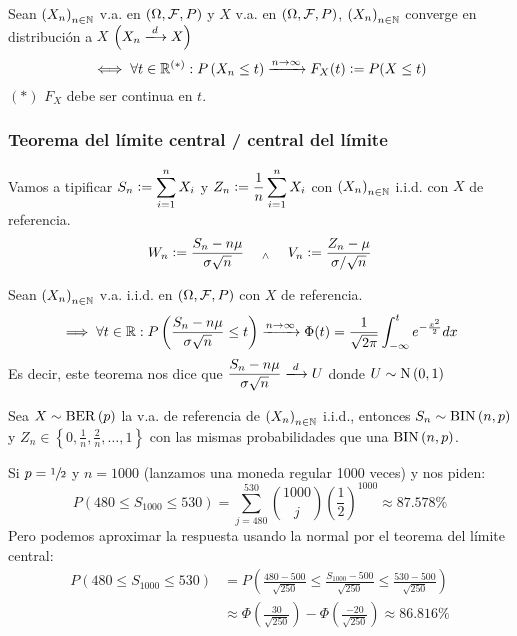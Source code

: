 \begin{defn}
	Sean $\left(X_n\right)_{n\in \mathbb{N}}$ v.a. en $(\Omega, \mathcal{F}, P)$ y $X$ v.a. en $(\Omega, \mathcal{F}, P)$, $\left(X_n\right)_{n\in \mathbb{N}}$ {converge en distribución} a $X$ $\left(X_n \xlongrightarrow{d} X\right)$
	\[\iff \forall t \in \mathbb{R}^{(*)} : P\left(X_n \leq t\right) \xrightarrow{n\to\infty} F_X(t) \vcentcolon= P(X \leq t)\]
	\hspace*{\fill} $(*)$ $F_X$ debe ser continua en $t$.
\end{defn}

\subsubsection{Teorema del límite central / central del límite}

Vamos a tipificar $\displaystyle S_n\vcentcolon= \sum_{i=1}^{n} X_i$ y $\displaystyle Z_n \vcentcolon= \frac{1}{n}\sum_{i=1}^{n} X_i$ con $\left(X_n\right)_{n\in \mathbb{N}}$ i.i.d. con $X$ de referencia.
\[W_n \vcentcolon= \frac{S_n - n\mu}{\sigma \sqrt{n}} \quad \; _{\wedge} \; \quad V_n \vcentcolon= \frac{Z_n - \mu}{\sigma/\sqrt{n}}\]

\begin{teo}
	Sean $\left(X_n\right)_{n\in \mathbb{N}}$ v.a. i.i.d. en $(\Omega, \mathcal{F}, P)$ con $X$ de referencia.
	\[\implies \forall t \in \mathbb{R} : P\left(\frac{S_n - n\mu}{\sigma \sqrt{n}} \leq t\right) \xrightarrow{n\to\infty} \Phi(t) = \frac{1}{\sqrt{2\pi}}\int_{-\infty}^{t} e^{-\frac{x^2}{2}}dx\]
	Es decir, este teorema nos dice que $\ds \frac{S_n - n\mu}{\sigma \sqrt{n}} \xlongrightarrow{d} U$ donde $U\sim\operatorname{N}\left(0,1\right)$
\end{teo}

\begin{ejem}
	Sea $X\sim \operatorname{BER}\left(p\right)$ la v.a. de referencia de $\left(X_n\right)_{n\in \mathbb{N}}$ i.i.d., entonces $S_n \sim \operatorname{BIN}\left(n,p\right)$ y $Z_n \in \left\{0, \frac{1}{n}, \frac{2}{n}, \dots, 1\right\}$ con las mismas probabilidades que una $\operatorname{BIN}\left(n,p\right)$.

	Si $p=\sfrac{1}{2}$ y $n=1000$ (lanzamos una moneda regular 1000 veces) y nos piden:
	\[P(480 \leq S_1000 \leq 530) = \sum_{j=480}^{530} \binom{1000}{j} \left(\frac{1}{2}\right)^{1000} \approx 87.578\%\]
	Pero podemos aproximar la respuesta usando la normal por el teorema del límite central:
	\[\begin{aligned}
			P(480 \leq S_1000 \leq 530) & = P\left(\frac{480-500}{\sqrt{250}} \leq \frac{S_{1000}-500}{\sqrt{250}} \leq \frac{530-500}{\sqrt{250}}\right) \\
			                            & \approx \Phi\left(\frac{30}{\sqrt{250}}\right) - \Phi\left(\frac{-20}{\sqrt{250}}\right) \approx 86.816\%
		\end{aligned}\]
\end{ejem}

